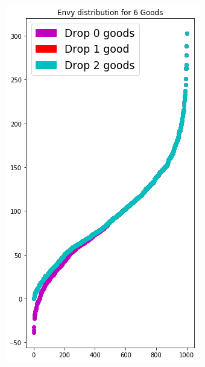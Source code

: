 \begin{figure}[h!]
\begin{subfigure}[b]{0.47\linewidth}
    \includegraphics[width=\linewidth]{images/envy_density/envy_density_u6.png}
    \caption{}
  \end{subfigure}
  \begin{subfigure}[b]{0.47\linewidth}

\end{subfigure}
\end{figure}
